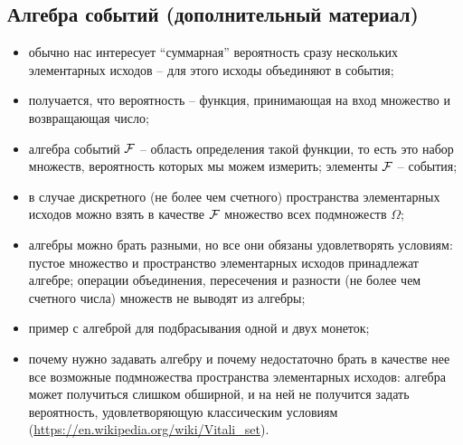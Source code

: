 \subsection*{Алгебра событий (дополнительный материал)}
\begin{itemize}
    \item
    обычно нас интересует ``суммарная'' вероятность сразу нескольких элементарных исходов -- для этого исходы объединяют в события;
    \item
    получается, что вероятность -- функция, принимающая на вход множество и возвращающая число;
    \item
    алгебра событий $\operatorname{\mathcal{F}}$ -- область определения такой функции, то есть это набор множеств, вероятность которых мы можем измерить;
    элементы $\operatorname{\mathcal{F}}$ -- события;
    \item 
    в случае дискретного (не более чем счетного) пространства элементарных исходов можно взять в качестве $\operatorname{\mathcal{F}}$ множество всех подмножеств $\Omega$;
    \item
    алгебры можно брать разными, но все они обязаны удовлетворять условиям:
    пустое множество и пространство элементарных исходов принадлежат алгебре;
    операции объединения, пересечения и разности (не более чем счетного числа) множеств не выводят из алгебры;
    \item
    пример с алгеброй для подбрасывания одной и двух монеток;
    \item
    почему нужно задавать алгебру и почему недостаточно брать в качестве нее все возможные подмножества пространства элементарных исходов:
    алгебра может получиться слишком обширной, и на ней не получится задать вероятность, удовлетворяющую классическим условиям (\url{https://en.wikipedia.org/wiki/Vitali\_set}).
\end{itemize}

